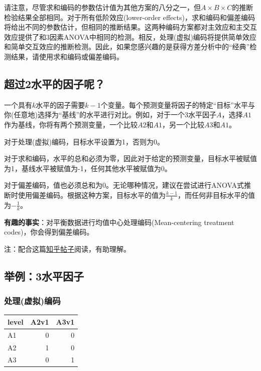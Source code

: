 \documentclass[
]{book}
\begin{document}
请注意，尽管求和编码的参数估计值为其他方案的八分之一，但\(A \times B \times C\)的推断检验结果全部相同。对于所有低阶效应(lower-order effects)，求和编码和偏差编码将给出不同的参数估计，但相同的推断结果。这两种编码方案都对主效应和主交互效应提供了和3因素ANOVA中相同的检测。相反，处理(虚拟)编码将提供简单效应和简单交互效应的推断检测。因此，如果您感兴趣的是获得方差分析中的``经典''检测结果，请使用求和编码或偏差编码。

\hypertarget{ux8d85ux8fc72ux6c34ux5e73ux7684ux56e0ux5b50ux5462}{%
\subsection{超过2水平的因子呢？}\label{ux8d85ux8fc72ux6c34ux5e73ux7684ux56e0ux5b50ux5462}}

一个具有\(k\)水平的因子需要\(k-1\)个变量。每个预测变量将因子的特定``目标''水平与你(任意地)选择为``基线''的水平进行对比。例如，对于一个3水平因子\(A\)，选择\(A1\)作为基线，你将有两个预测变量，一个比较\(A2\)和\(A1\)，另一个比较\(A3\)和\(A1\)。

对于处理(虚拟)编码，目标水平设置为1，否则为0。

对于求和编码，水平的总和必须为零，因此对于给定的预测变量，目标水平被赋值为1，基线水平被赋值为-1，任何其他水平被赋值为0。

对于偏差编码，值也必须总和为0。无论哪种情况，建议在尝试进行ANOVA式推断时使用偏差编码。根据这种方案，目标水平的值为\(\frac{k-1}{k}\)，而任何非目标水平的值为\(-\frac{1}{k}\)。

\textbf{有趣的事实}：对平衡数据进行均值中心处理编码(Mean-centering treatment codes)，你会得到偏差编码。

注：配合这篇\href{https://zhuanlan.zhihu.com/p/513227882?ssr_src=heifetz}{知乎帖子}阅读，有助理解。

\hypertarget{ux4e3eux4f8b3ux6c34ux5e73ux56e0ux5b50}{%
\subsection{举例：3水平因子}\label{ux4e3eux4f8b3ux6c34ux5e73ux56e0ux5b50}}

\hypertarget{ux5904ux7406ux865aux62dfux7f16ux7801}{%
\subsubsection{处理(虚拟)编码}\label{ux5904ux7406ux865aux62dfux7f16ux7801}}

\begin{table}
\centering
\begin{tabular}{l|r|r}
\hline
level & A2v1 & A3v1\\
\hline
A1 & 0 & 0\\
\hline
A2 & 1 & 0\\
\hline
A3 & 0 & 1\\
\hline
\end{tabular}
\end{table}
\end{document}
